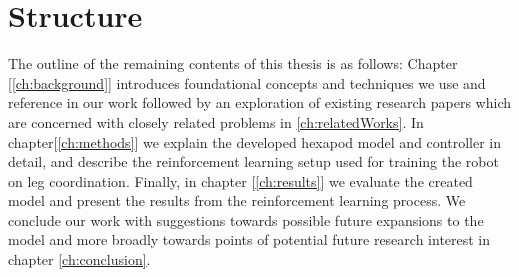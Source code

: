 %

\section{Structure}
The outline of the remaining contents of this thesis is as follows:
Chapter [\ref{ch:background}]  introduces foundational concepts and techniques we use and reference in our work followed by an exploration of existing research papers which are concerned with closely related problems in \ref{ch:relatedWorks}.
In chapter[\ref{ch:methods}] we explain the developed hexapod model and controller in detail, and describe the reinforcement learning setup used for training the robot on leg coordination.
Finally, in chapter [\ref{ch:results}] we evaluate the created model and present the results from the reinforcement learning process.
We conclude our work with suggestions towards possible future expansions to the model and more broadly towards points of potential future research interest in chapter \ref{ch:conclusion}.